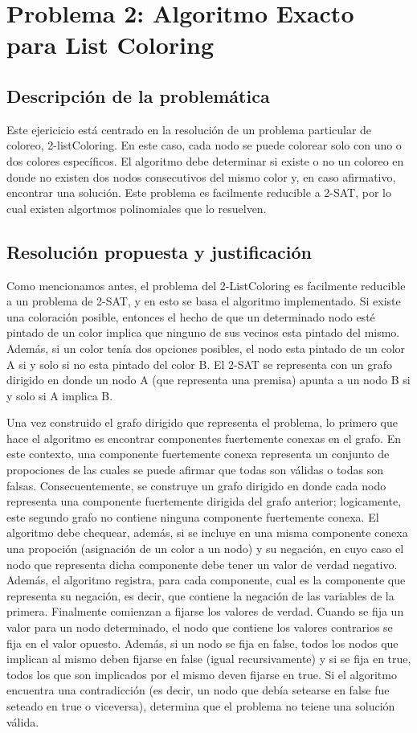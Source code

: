 \newpage
\section{Problema 2: Algoritmo Exacto para List Coloring}

\subsection{Descripción de la problemática}
Este ejericicio está centrado en la resolución de un problema particular de coloreo, 2-listColoring. En este caso, cada nodo se puede colorear solo con uno o dos colores específicos. El algoritmo debe determinar si existe o no un coloreo en donde no existen dos nodos consecutivos del mismo color y, en caso afirmativo, encontrar una solución.
Este problema es facilmente reducible a 2-SAT, por lo cual existen algortmos polinomiales que lo resuelven.

\subsection{Resolución propuesta y justificación}
Como mencionamos antes, el problema del 2-ListColoring es facilmente reducible a un problema de 2-SAT, y en esto se basa el algoritmo implementado. Si existe una coloración posible, entonces el hecho de que un determinado nodo esté pintado de un color implica que ninguno de sus vecinos esta pintado del mismo. Además, si un color tenía dos opciones posibles, el nodo esta pintado de un color A si y solo si no esta pintado del color B.
El 2-SAT se representa con un grafo dirigido en donde un nodo A (que representa una premisa) apunta a un nodo B si y solo si A implica B.

Una vez construido el grafo dirigido que representa el problema, lo primero que hace el algoritmo es encontrar componentes fuertemente conexas en el grafo. En este contexto, una componente fuertemente conexa representa un conjunto de propociones de las cuales se puede afirmar que todas son válidas o todas son falsas. Consecuentemente, se construye un grafo dirigido en donde cada nodo representa una componente fuertemente dirigida del grafo anterior; logicamente, este segundo grafo no contiene ninguna componente fuertemente conexa. 
El algoritmo debe chequear, además, si se incluye en una misma componente conexa una propoción (asignación de un color a un nodo) y su negación, en cuyo caso el nodo que representa dicha componente debe tener un valor de verdad negativo. Además, el algoritmo registra, para cada componente, cual es la componente que representa su negación, es decir, que contiene la negación de las variables de la primera.
Finalmente comienzan a fijarse los valores de verdad. Cuando se fija un valor para un nodo determinado, el nodo que contiene los valores contrarios se fija en el valor opuesto. Además, si un nodo se fija en false, todos los nodos que implican al mismo deben fijarse en false (igual recursivamente) y si se fija en true, todos los que son implicados por el mismo deven fijarse en true. Si el algoritmo encuentra una contradicción (es decir, un nodo que debía setearse en false fue seteado en true o viceversa), determina que el problema no teiene una solución válida.


